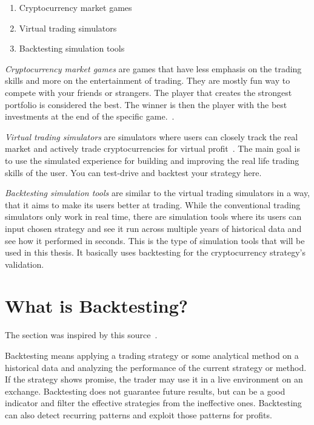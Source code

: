 \begin{enumerate}
    \item Cryptocurrency market games
    \item Virtual trading simulators
    \item Backtesting simulation tools
\end{enumerate}

\emph{Cryptocurrency market games} are games that have less emphasis on the trading skills and more on the entertainment of trading. They are mostly fun way to compete with your friends or strangers. The player that creates the strongest portfolio is considered the best. The winner is then the player with the best investments at the end of the specific game.~\cite{top-stocks-crypto-trading-simulators}.

\emph{Virtual trading simulators} are simulators where users can closely track the real market and actively trade cryptocurrencies for virtual profit~\cite{top-stocks-crypto-trading-simulators}. The main goal is to use the simulated experience for building and improving the real life trading skills of the user. You can test-drive and backtest your strategy here.

\emph{Backtesting simulation tools} are similar to the virtual trading simulators in a way, that it aims to make its users better at trading. While the conventional trading simulators only work in real time, there are simulation tools where its users can input chosen strategy and see it run across multiple years of historical data and see how it performed in seconds. This is the type of simulation tools that will be used in this thesis. It basically uses backtesting for the cryptocurrency strategy's validation.

\section{What is Backtesting?}
The section was inspired by this source~\cite{backtesting-crypto-trading-strategies}.

Backtesting means applying a trading strategy or some analytical method on a historical data and analyzing the performance of the current strategy or method. If the strategy shows promise, the trader may use it in a live environment on an exchange. Backtesting does not guarantee future results, but can be a good indicator and filter the effective strategies from the ineffective ones. Backtesting can also detect recurring patterns and exploit those patterns for profits.

